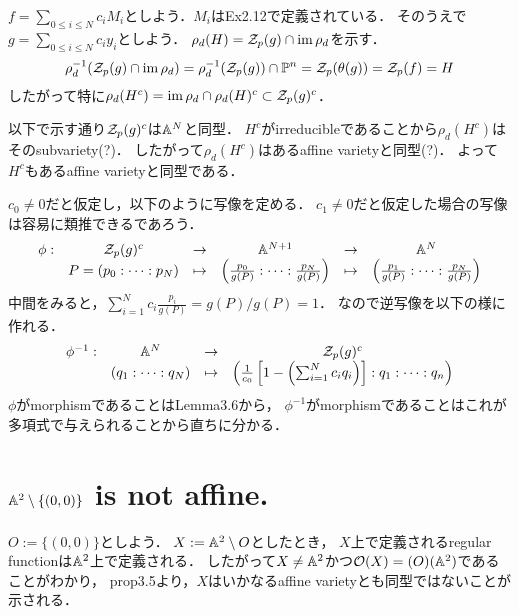 \documentclass[a4paper]{jsarticle}
\begin{document}
    $f=\sum_{0 \leq i \leq N}{c_i M_i}$としよう．$M_i$はEx2.12で定義されている．
    そのうえで$g=\sum_{0 \leq i \leq N}{c_i y_i}$としよう．
    $\rho_d(H)=\mathcal{Z}_p(g) \cap \operatorname{im} \rho_d$を示す．
    \[ \rho_d^{-1}(\mathcal{Z}_p(g) \cap \operatorname{im} \rho_d)=\rho_d^{-1}(\mathcal{Z}_p(g)) \cap \mathbb{P}^n=\mathcal{Z}_p(\theta(g))=\mathcal{Z}_p(f)=H \]
    したがって特に$\rho_d(H^c)=\operatorname{im} \rho_d \cap \rho_d(H)^c \subset \mathcal{Z}_p(g)^c$．

    以下で示す通り$\mathcal{Z}_p(g)^c$は$\mathbb{A}^N$と同型．
    $H^c$がirreducibleであることから$\rho_d(H^c)$はそのsubvariety(?)．
    したがって$\rho_d(H^c)$はあるaffine varietyと同型(?)．
    よって$H^c$もあるaffine varietyと同型である．

    $c_0 \neq 0$だと仮定し，以下のように写像を定める．
    $c_1 \neq 0$だと仮定した場合の写像は容易に類推できるであろう．
    \[
        \begin{array}{ccccccc}
        \phi:
            &\mathcal{Z}_p(g)^c
            &\to &\mathbb{A}^{N+1}
            &\to &\mathbb{A}^N \\
        {}  &P=(p_0:\dots:p_N)
            &\mapsto &\left( \frac{p_0}{g(P)}:\dots:\frac{p_N}{g(P)} \right)
            &\mapsto &\left( \frac{p_1}{g(P)}:\dots:\frac{p_N}{g(P)} \right)
    \end{array}
    \]
    中間をみると，$\sum_{i=1}^{N}{c_i \frac{p_i}{g(P)}}=g(P)/g(P)=1$．
    なので逆写像を以下の様に作れる．
    \[
        \begin{array}{ccccccc}
            \phi^{-1}:
            &\mathbb{A}^N
            &\to &\mathcal{Z}_p(g)^c \\
        {}  &(q_1:\dots:q_N)
            &\mapsto &\left( \frac{1}{c_0} \left[1-\left( \sum_{i=1}^{N}{c_i q_i} \right) \right]: q_1:\dots:q_n \right)
    \end{array}
    \]
    $\phi$がmorphismであることはLemma3.6から，
    $\phi^{-1}$がmorphismであることはこれが多項式で与えられることから直ちに分かる．

\section{$\mathbb{A}^2 \setminus \{(0,0)\}$ is not affine.} %
    $O:=\{(0,0)\}$としよう．
    $X:=\mathbb{A}^2 \setminus O$としたとき，
    $X$上で定義されるregular functionは$\mathbb{A}^2$上で定義される．
    したがって$X \neq \mathbb{A}^2$かつ$\mathcal{O}(X)=\mathcal(O)(\mathbb{A}^2)$であることがわかり，
    prop3.5より，$X$はいかなるaffine varietyとも同型ではないことが示される．
\end{document}
